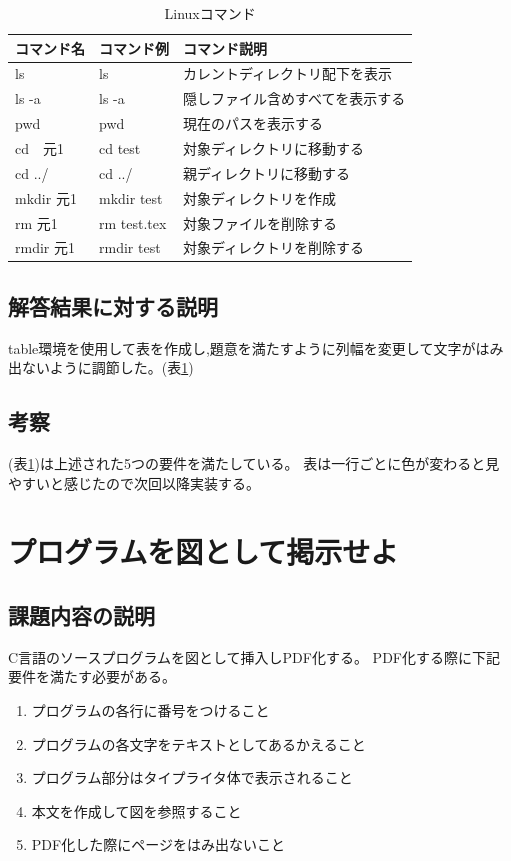 \documentclass[fontsize = 14pt, paper= a4]{jlreq}
\begin{document}
\begin{table}[h]
  \centering
  \caption{Linuxコマンド}
  \label{tab:linux_cmd_list}
  \begin{tabular}{|p{30mm}|p{30mm}|p{80mm}|} \hline
    
    コマンド名 & コマンド例 & コマンド説明 \\  \hline
    
    ls&ls&カレントディレクトリ配下を表示 \\  \hline

    ls -a & ls -a & 隠しファイル含めすべてを表示する \\ \hline

    pwd & pwd & 現在のパスを表示する \\ \hline

    cd　元1 & cd test & 対象ディレクトリに移動する \\ \hline

    cd ../ & cd ../ & 親ディレクトリに移動する　\\ \hline

    mkdir 元1 & mkdir test & 対象ディレクトリを作成 \\ \hline

    rm 元1 & rm test.tex & 対象ファイルを削除する　\\ \hline

    rmdir 元1 & rmdir test & 対象ディレクトリを削除する \\ \hline
  \end{tabular}
  
\end{table}
\subsection{解答結果に対する説明}
table環境を使用して表を作成し,題意を満たすように列幅を変更して文字がはみ出ないように調節した。(表\ref{tab:linux_cmd_list})
\subsection{考察}
(表\ref{tab:linux_cmd_list})は上述された5つの要件を満たしている。
表は一行ごとに色が変わると見やすいと感じたので次回以降実装する。

\section{プログラムを図として掲示せよ}
\subsection{課題内容の説明}
C言語のソースプログラムを図として挿入しPDF化する。
PDF化する際に下記要件を満たす必要がある。
\begin{enumerate}
\item プログラムの各行に番号をつけること
\item プログラムの各文字をテキストとしてあるかえること
\item プログラム部分はタイプライタ体で表示されること
\item 本文を作成して図を参照すること
\item PDF化した際にページをはみ出ないこと
\end{enumerate}
\end{document}
